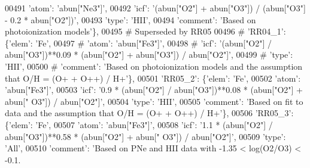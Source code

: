 \begin{DoxyCode}
00491                                       \textcolor{stringliteral}{'atom'}: \textcolor{stringliteral}{'abun["Ne3"]'},
00492                                       \textcolor{stringliteral}{'icf'}: \textcolor{stringliteral}{'(abun["O2"] + abun["O3"]) / (abun["O3"] - 0.2 * abun["O2"])'},
00493                                       \textcolor{stringliteral}{'type'}: \textcolor{stringliteral}{'HII'},
00494                                       \textcolor{stringliteral}{'comment'}: \textcolor{stringliteral}{'Based on photoionization models'}\},
00495 \textcolor{comment}{# Superseded by RR05}
00496 \textcolor{comment}{#                         'RR04\_1': \{'elem': 'Fe',}
00497 \textcolor{comment}{#                                      'atom': 'abun["Fe3"]',}
00498 \textcolor{comment}{#                                      'icf': '(abun["O2"] / abun["O3"])**0.09 * (abun["O2"] + abun["O3"])
       / abun["O2"]',}
00499 \textcolor{comment}{#                                      'type': 'HII',}
00500 \textcolor{comment}{#                                      'comment': 'Based on photoionization models and the assumption that
       O/H = (O+ + O++) / H+'\},}
00501                          \textcolor{stringliteral}{'RR05\_2'}: \{\textcolor{stringliteral}{'elem'}: \textcolor{stringliteral}{'Fe'},
00502                                       \textcolor{stringliteral}{'atom'}: \textcolor{stringliteral}{'abun["Fe3"]'},
00503                                       \textcolor{stringliteral}{'icf'}: \textcolor{stringliteral}{'0.9 * (abun["O2"] / abun["O3"])**0.08 * (abun["O2"] + abun["
      O3"]) / abun["O2"]'},
00504                                       \textcolor{stringliteral}{'type'}: \textcolor{stringliteral}{'HII'},
00505                                       \textcolor{stringliteral}{'comment'}: \textcolor{stringliteral}{'Based on fit to data and the assumption that O/H = (O+ +
       O++) / H+'}\},
00506                          \textcolor{stringliteral}{'RR05\_3'}: \{\textcolor{stringliteral}{'elem'}: \textcolor{stringliteral}{'Fe'},
00507                                       \textcolor{stringliteral}{'atom'}: \textcolor{stringliteral}{'abun["Fe3"]'},
00508                                       \textcolor{stringliteral}{'icf'}: \textcolor{stringliteral}{'1.1 * (abun["O2"] / abun["O3"])**0.58 * (abun["O2"] + abun["
      O3"]) / abun["O2"]'},
00509                                       \textcolor{stringliteral}{'type'}: \textcolor{stringliteral}{'All'},
00510                                       \textcolor{stringliteral}{'comment'}: \textcolor{stringliteral}{'Based on PNe and HII data with -1.35 < log(O2/O3) < -0.1.
}
\end{DoxyCode}
